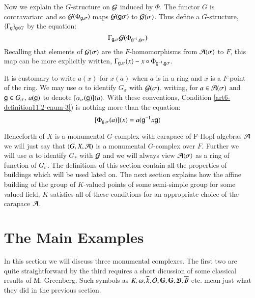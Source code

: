 Now we explain the $G$-structure on $\mathcal{G}$ induced by $\Phi$. The functor $G$ is contravariant and so $\mathcal{G}(\Phi_{\mathsf{g}, \sigma})$ maps $\mathcal{G}(\mathsf{g} \sigma)$ to $\mathcal{G}(\sigma)$. Thus define a $G$-structure, $\{\Gamma_{\mathsf{g}}\}_{\mathsf{g} \in G}$ by the equation:
\begin{equation}\label{art6-eq-11.4}
\Gamma_{\mathsf{g}, \sigma} \mathcal{G}(\Phi_{\mathsf{g}^{-1}, \mathsf{g} \sigma})
\end{equation}
Recalling that elements of $\mathcal{G}(\sigma)$ are the $F$-homomorphisms from $\mathcal{A}(\sigma)$ to $F$, this map can be more explicitly written, $\Gamma_{\mathsf{g}, \sigma}(x) - x \circ \Phi_{\mathsf{g}^{-1}, \mathsf{g} \sigma}$.

It is customary to write $a(x)$ for $x(a)$ when $a$ is in a ring and $x$ is a $F$-point of the ring. We may use $\alpha$ to identify $G_{\sigma}$ with $\mathcal{G}(\sigma)$, writing, for $a\in \mathcal{A}(\sigma)$ and $\mathsf{g} \in G_{\sigma}$, $a(\mathsf{g})$ to denote $[\alpha_{\sigma}(\mathsf{g})](a)$. With these conventions, Condition \ref{art6-definition11.2-enum-3}) is nothing more than the equation: 
\begin{equation}\label{art6-eq-11.5}
[\Phi_{\mathsf{g}, \sigma}(a)](x) = a(\mathsf{g}^{-1}x \mathsf{g})
\end{equation}

Henceforth of $X$ is a monumental $G$-complex with carapace of F-Hopf algebras $\mathcal{A}$ we will just say that $(G, X, \mathcal{A})$ is a monumental $G$-complex over $F$. Further we will use $\alpha$ to identify $G_{*}$ with $\mathcal{G}$ and we will always view $\mathcal{A}(\sigma)$ as a ring of function of $G_{\sigma}$. The definitions of this section contain all the properties of buildings which will be used lated on. The next section explains how the affine building of the group of $K$-valued points of some semi-simple group for some valued field, $K$ satisfies all of these conditions for an appropriate choice of the carapace $\mathcal{A}$.  

\section{The Main Examples}\label{art6-sec-12}
 In this section we will discuss three monumental complexes. The first two are quite straightforward by the third requires a short dicussion of some classical results of M. Greenberg. Such symbols as $K, \omega, \overline{k}, \mathcal{O}, \mathbf{G}, \mathbf{G}, \mathcal{B}, \overline{B}$ etc. mean just what they did in the previous section.  

